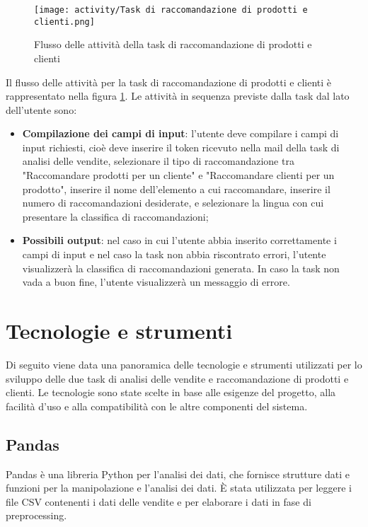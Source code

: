 \begin{figure}[!h]
    \centering 
    \texttt{[image: activity/Task di raccomandazione di prodotti e clienti.png]}
    \caption{Flusso delle attività della task di raccomandazione di prodotti e clienti}
    \label{fig:activity-recommendation-products-customers}
\end{figure}

Il flusso delle attività per la task di raccomandazione di prodotti e clienti è rappresentato nella figura \ref{fig:activity-recommendation-products-customers}. Le attività in sequenza previste dalla task dal lato dell'utente sono:
\begin{itemize}
    \item \textbf{Compilazione dei campi di input}: l'utente deve compilare i campi di input richiesti, cioè deve inserire il token ricevuto nella mail della task di analisi delle vendite, selezionare il tipo di raccomandazione tra "Raccomandare prodotti per un cliente" e "Raccomandare clienti per un prodotto", inserire il nome dell'elemento a cui raccomandare, inserire il numero di raccomandazioni desiderate, e selezionare la lingua con cui presentare la classifica di raccomandazioni;
    \item \textbf{Possibili output}: nel caso in cui l'utente abbia inserito correttamente i campi di input e nel caso la task non abbia riscontrato errori, l'utente visualizzerà la classifica di raccomandazioni generata. In caso la task non vada a buon fine, l'utente visualizzerà un messaggio di errore.
\end{itemize}


\section{Tecnologie e strumenti}
\label{sec:tecnologie-strumenti}

Di seguito viene data una panoramica delle tecnologie e strumenti utilizzati per lo sviluppo delle due task di analisi delle vendite e raccomandazione di prodotti e clienti. Le tecnologie sono state scelte in base alle esigenze del progetto, alla facilità d'uso e alla compatibilità con le altre componenti del sistema.

\subsection{Pandas}
Pandas è una libreria Python per l'analisi dei dati, che fornisce strutture dati e funzioni per la manipolazione e l'analisi dei dati. È stata utilizzata per leggere i file CSV contenenti i dati delle vendite e per elaborare i dati in fase di preprocessing.

